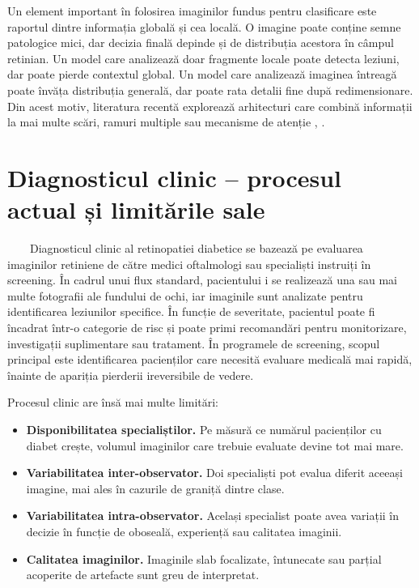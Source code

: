 \documentclass[12pt, a4paper, oneside, romanian]{teza-upb}
\begin{document}
Un element important în folosirea imaginilor fundus pentru clasificare este raportul dintre informația globală și cea locală. O imagine poate conține semne patologice mici, dar decizia finală depinde și de distribuția acestora în câmpul retinian. Un model care analizează doar fragmente locale poate detecta leziuni, dar poate pierde contextul global. Un model care analizează imaginea întreagă poate învăța distribuția generală, dar poate rata detalii fine după redimensionare. Din acest motiv, literatura recentă explorează arhitecturi care combină informații la mai multe scări, ramuri multiple sau mecanisme de atenție \cite{11_shakibania2024dual}, \cite{7_huang2022rtnet}.

\section{Diagnosticul clinic -- procesul actual și limitările sale}

\ \ \ \ Diagnosticul clinic al retinopatiei diabetice se bazează pe evaluarea imaginilor retiniene de către medici oftalmologi sau specialiști instruiți în screening. În cadrul unui flux standard, pacientului i se realizează una sau mai multe fotografii ale fundului de ochi, iar imaginile sunt analizate pentru identificarea leziunilor specifice. În funcție de severitate, pacientul poate fi încadrat într-o categorie de risc și poate primi recomandări pentru monitorizare, investigații suplimentare sau tratament. În programele de screening, scopul principal este identificarea pacienților care necesită evaluare medicală mai rapidă, înainte de apariția pierderii ireversibile de vedere.
\bigskip

Procesul clinic are însă mai multe limitări:

\begin{itemize}
  \item \textbf{Disponibilitatea specialiștilor.} Pe măsură ce numărul pacienților cu diabet crește, volumul imaginilor care trebuie evaluate devine tot mai mare.
  \item \textbf{Variabilitatea inter-observator.} Doi specialiști pot evalua diferit aceeași imagine, mai ales în cazurile de graniță dintre clase.
  \item \textbf{Variabilitatea intra-observator.} Același specialist poate avea variații în decizie în funcție de oboseală, experiență sau calitatea imaginii.
  \item \textbf{Calitatea imaginilor.} Imaginile slab focalizate, întunecate sau parțial acoperite de artefacte sunt greu de interpretat.
\end{itemize}
\bigskip
\end{document}
